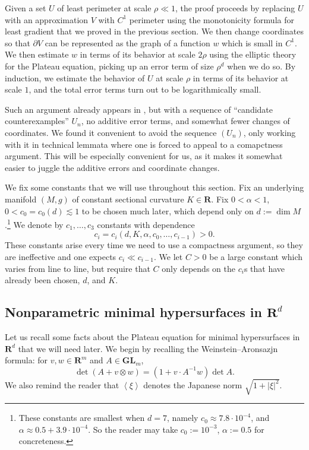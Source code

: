 \documentclass[reqno,10pt]{amsart}
\newcommand{\RR}{\mathbf{R}}
\newcommand{\GL}{\mathbf{GL}}
\def\Japan#1{\left \langle #1 \right \rangle}
\theoremstyle{definition}
\numberwithin{equation}{section}
\begin{document}
Given a set $U$ of least perimeter at scale $\rho \ll 1$, the proof proceeds by replacing $U$ with an approximation $V$ with $C^1$ perimeter using the monotonicity formula for least gradient that we proved in the previous section.
We then change coordinates so that $\partial V$ can be represented as the graph of a function $w$ which is small in $C^1$.
We then estimate $w$ in terms of its behavior at scale $2\rho$ using the elliptic theory for the Plateau equation, picking up an error term of size $\rho^d$ when we do so.
By induction, we estimate the behavior of $U$ at scale $\rho$ in terms of its behavior at scale $1$, and the total error terms turn out to be logarithmically small.

Such an argument already appears in \cite{Miranda66}, but with a sequence of ``candidate counterexamples'' $U_n$, no additive error terms, and somewhat fewer changes of coordinates.
We found it convenient to avoid the sequence $(U_n)$, only working with it in technical lemmata where one is forced to appeal to a comapctness argument.
This will be especially convenient for us, as it makes it somewhat easier to juggle the additive errors and coordinate changes.

We fix some constants that we will use throughout this section.
Fix an underlying manifold $(M, g)$ of constant sectional curvature $K \in \RR$.
Fix $0 < \alpha < 1$, $0 < c_0 = c_0(d) \lesssim 1$ to be chosen much later, which depend only on $d := \dim M$.\footnote{These constants are smallest when $d = 7$, namely $c_0 \approx 7.8 \cdot 10^{-4}$, and $\alpha \approx 0.5 + 3.9 \cdot 10^{-4}$. So the reader may take $c_0 := 10^{-3}$, $\alpha := 0.5$ for concreteness.} 
We denote by $c_1, \dots, c_3$ constants with dependence
$$c_i = c_i(d, K, \alpha, c_0, \dots, c_{i - 1}) > 0.$$
These constants arise every time we need to use a compactness argument, so they are ineffective and one expects $c_i \ll c_{i - 1}$.
We let $C > 0$ be a large constant which varies from line to line, but require that $C$ only depends on the $c_i$s that have already been chosen, $d$, and $K$.


\subsection{Nonparametric minimal hypersurfaces in \texorpdfstring{$\RR^d$}{Rd}}
Let us recall some facts about the Plateau equation for minimal hypersurfaces in $\RR^d$ that we will need later.
We begin by recalling the Weinstein--Aronsazjn formula: for $v, w \in \RR^m$ and $A \in \GL_m$,
\begin{equation}\label{Weinstein Aronsazjn}
\det(A + v \otimes w) = (1 + v \cdot A^{-1}w) \det A.
\end{equation}
We also remind the reader that $\Japan\xi$ denotes the Japanese norm $\sqrt{1 + |\xi|^2}$.
\end{document}
